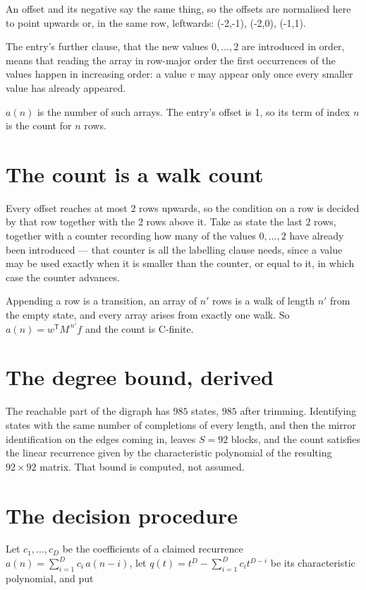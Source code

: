 \documentclass[11pt]{article}
\theoremstyle{definition}
\begin{document}
An offset and its negative say the same thing, so the offsets are normalised here to point upwards or, in the same row, leftwards: (-2,-1), (-2,0), (-1,1).

The entry's further clause, that the new values $0,\dots,2$ are introduced in order, means that reading the array in row-major order the first occurrences of the values happen in increasing order: a value $v$ may appear only once every smaller value has already appeared.

$a(n)$ is the number of such arrays. The entry's offset is 1, so its term of index $n$ is the count for $n$ rows.

\section{The count is a walk count}

Every offset reaches at most $2$ rows upwards, so the condition on a row is decided by that row together with the $2$ rows above it. Take as state the last $2$ rows, together with a counter recording how many of the values $0,\dots,2$ have already been introduced --- that counter is all the labelling clause needs, since a value may be used exactly when it is smaller than the counter, or equal to it, in which case the counter advances.

Appending a row is a transition, an array of $n'$ rows is a walk of length $n'$ from the empty state, and every array arises from exactly one walk. So $a(n) = w^{\mathsf T}M^{\,n'}f$ and the count is C-finite.

\section{The degree bound, derived}

The reachable part of the digraph has $985$ states, $985$ after trimming. Identifying states with the same number of completions of every length, and then the mirror identification on the edges coming in, leaves $S = 92$ blocks, and the count satisfies the linear recurrence given by the characteristic polynomial of the resulting $92\times92$ matrix. That bound is computed, not assumed.

\section{The decision procedure}

Let $c_1,\dots,c_D$ be the coefficients of a claimed recurrence $a(n) = \sum_{i=1}^{D} c_i\,a(n-i)$, let $q(t) = t^{D} - \sum_{i=1}^{D} c_i t^{D-i}$ be its characteristic polynomial, and put
\end{document}
